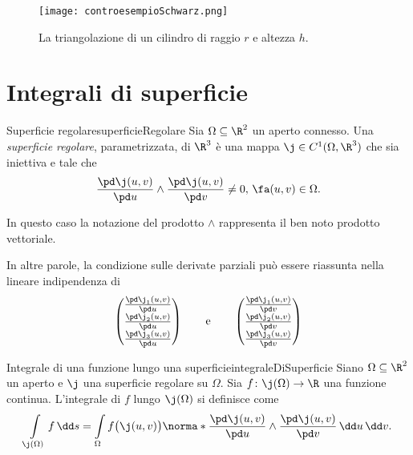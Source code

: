 \begin{figure}[tp]
	\begin{centering}
		\texttt{[image: controesempioSchwarz.png]}
		\caption{La triangolazione di un cilindro di raggio \(r\) e altezza \(h\).}
		\label{fig:controesempioSchwarz}
	\end{centering}
\end{figure}
%
%
\section{Integrali di superficie}

\begin{defn}{Superficie regolare}{superficieRegolare}
	Sia \(\Omega\subseteq\R^2\) un aperto connesso.
	Una \emph{superficie regolare}, parametrizzata, di \(\R^3\) è una mappa \(\j\in C^1(\Omega,\R^3)\) che sia iniettiva e tale che
	\[
		\frac{\pd \j(u,v)}{\pd u} \wedge \frac{\pd \j(u,v)}{\pd v} \neq 0,\,\fa (u,v)\in \Omega.
	\]
\end{defn}

\begin{notz}
	In questo caso la notazione del prodotto \(\wedge\) rappresenta il ben noto prodotto vettoriale.
\end{notz}

\begin{oss}
	In altre parole, la condizione sulle derivate parziali può essere riassunta nella lineare indipendenza di
	\[
		\begin{pmatrix}
			\frac{\pd \j_1(u,v)}{\pd u} \\
			\frac{\pd \j_2(u,v)}{\pd u} \\
			\frac{\pd \j_3(u,v)}{\pd u}
		\end{pmatrix}
		\qquad\text{e}\qquad
		\begin{pmatrix}
			\frac{\pd \j_1(u,v)}{\pd v} \\
			\frac{\pd \j_2(u,v)}{\pd v} \\
			\frac{\pd \j_3(u,v)}{\pd v}
		\end{pmatrix}
	\]
\end{oss}

\begin{defn}{Integrale di una funzione lungo una superficie}{integraleDiSuperficie}
	Siano \(\Omega\subseteq\R^2\) un aperto e \(\j\) una superficie regolare su \(\Omega\).
	Sia \(f\colon \j(\Omega) \to \R\) una funzione continua.
	L'integrale di \(f\) lungo \(\j(\Omega)\) si definisce come
	\[
		\int\limits_{\j(\Omega)} f\,\dd s = \int\limits_\Omega f\big(\j(u,v)\big) \norma*{\frac{\pd \j(u,v)}{\pd u}\wedge \frac{\pd \j(u,v)}{\pd v}}\,\dd u\,\dd v.
	\]
\end{defn}

